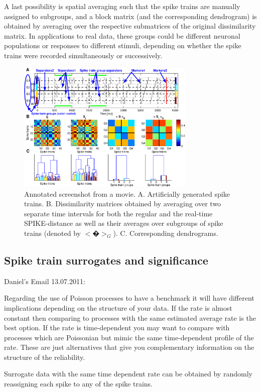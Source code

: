 \documentclass[10pt,twocolumn]{elsart5p}
\begin{document}
A last possibility is spatial averaging such that the spike trains are manually assigned to subgroups, and a block matrix (and the corresponding dendrogram) is obtained by averaging over the respective submatrices of the original dissimilarity matrix. In applications to real data, these groups could be different neuronal populations or responses to different stimuli, depending on whether the spike trains were recorded simultaneously or successively.
%
\begin{figure}
    \includegraphics[width=85mm]{Fig2-Movie-Screenshot.eps}
    \caption{\abb\label{fig:Fig2-Movie-Screenshot} Annotated screenshot from a movie.   A. Artificially generated spike trains.   B. Dissimilarity matrices obtained by averaging over two separate time intervals for both the regular and the real-time SPIKE-distance as well as their averages over subgroups of spike trains (denoted by $<�>_G$).   C. Corresponding dendrograms.}
\end{figure}


\subsection{\label{ss:Spike-train-surrogates} Spike train surrogates and significance}

Daniel's Email 13.07.2011:

Regarding the use of Poisson processes to have a benchmark it will have different implications depending on the structure of your data. If the rate is almost constant then comparing to processes with the same estimated average rate is the best option. If the rate is time-dependent you may want to compare with processes which are Poissonian but mimic the same time-dependent profile of the rate. These are just alternatives that give you complementary information on the structure of the reliability.

Surrogate data with the same time dependent rate can be obtained by randomly reassigning each spike to any of the spike trains.
\end{document}
